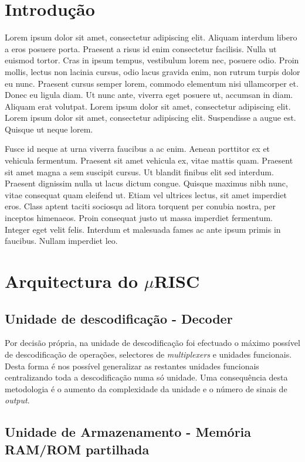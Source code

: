 \chapter{Introdução}

Lorem ipsum dolor sit amet, consectetur adipiscing elit. Aliquam interdum libero a eros posuere porta. Praesent a risus id enim consectetur facilisis. Nulla ut euismod tortor. Cras in ipsum tempus, vestibulum lorem nec, posuere odio. Proin mollis, lectus non lacinia cursus, odio lacus gravida enim, non rutrum turpis dolor eu nunc. Praesent cursus semper lorem, commodo elementum nisi ullamcorper et. Donec eu ligula diam. Ut nunc ante, viverra eget posuere ut, accumsan in diam. Aliquam erat volutpat. Lorem ipsum dolor sit amet, consectetur adipiscing elit. Lorem ipsum dolor sit amet, consectetur adipiscing elit. Suspendisse a augue est. Quisque ut neque lorem.

Fusce id neque at urna viverra faucibus a ac enim. Aenean porttitor ex et vehicula fermentum. Praesent sit amet vehicula ex, vitae mattis quam. Praesent sit amet magna a sem suscipit cursus. Ut blandit finibus elit sed interdum. Praesent dignissim nulla ut lacus dictum congue. Quisque maximus nibh nunc, vitae consequat quam eleifend ut. Etiam vel ultrices lectus, sit amet imperdiet eros. Class aptent taciti sociosqu ad litora torquent per conubia nostra, per inceptos himenaeos. Proin consequat justo ut massa imperdiet fermentum. Integer eget velit felis. Interdum et malesuada fames ac ante ipsum primis in faucibus. Nullam imperdiet leo.

\chapter{Arquitectura do $\mu$RISC}
\section{Unidade de descodificação - Decoder}

Por decisão própria, na unidade de descodificação foi efectuado o máximo possível de descodificação de operações, selectores de \textit{multiplexers} e unidades funcionais. Desta forma é nos possível generalizar as restantes unidades funcionais centralizando toda a descodificação numa só unidade. Uma consequência desta metodologia é o aumento da complexidade da unidade e o número de sinais de \textit{output}.

\section{Unidade de Armazenamento - Memória RAM/ROM partilhada}

